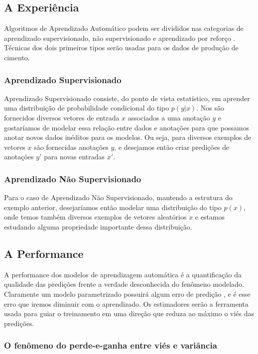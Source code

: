 \subsection{A Experiência}
\label{sec:exp}
Algoritmos de Aprendizado Automático podem ser divididos nas categorias de
aprendizado supervisionado, não supervisionado e aprendizado por reforço
\citep{dlbook}. Técnicas dos dois primeiros tipos serão usadas para os dados de
produção de cimento.


\subsubsection{Aprendizado Supervisionado}
\label{sec:apren} 
Aprendizado Supervisionado consiste, do ponto de vista estatístico, em aprender uma distribuição
de probabilidade condicional do tipo $p(y | x)$. Nos são fornecidos diversos vetores de
entrada $x$ associados a uma anotação $y$ e gostaríamos de modelar essa relação
entre dados e anotações para que possamos anotar novos dados inéditos para os
modelos. Ou seja, para diversos exemplos de vetores
$x$ são fornecidas anotações $y$, e desejamos então criar predições de anotações
$y'$ para novas entradas $x'$.


\subsubsection{Aprendizado Não Supervisionado}

Para o caso de Aprendizado Não Supervisionado, mantendo a estrutura do exemplo
anterior, desejaríamos então modelar uma distribuição do tipo $p(x)$, onde temos
também diversos exemplos de vetores aleatórios $x$ e estamos estudando alguma propriedade importante dessa distribuição.



\subsection{A Performance}
\label{sec:metricas}

A performance dos modelos de aprendizagem automática é a quantificação da
qualidade das predições frente a verdade desconhecida do fenômeno modelado.
Claramente um modelo parametrizado possuirá algum erro de predição \cite{dlbook}, e é esse
erro que iremos diminuir com o aprendizado. Os estimadores serão a ferramenta
usada para guiar o treinamento em uma direção que reduza ao máximo o viés das predições.

\subsubsection{O fenômeno do perde-e-ganha entre viés e variância}

